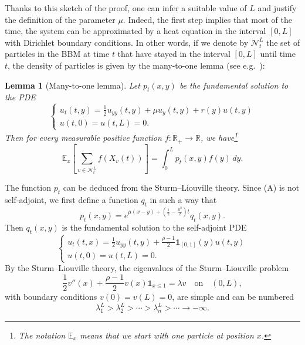 \documentclass[11pt]{article}
\theoremstyle{plain}
\newtheorem{lemma}{Lemma}[section]
\begin{document}
Thanks to this sketch of the proof, one can infer a suitable value of $L$ and justify the definition of the parameter $\mu$. Indeed, the first step implies that most of the time, the system can be approximated by a heat equation in the interval $[0,L]$ with Dirichlet boundary conditions. In other words, if we denote by $\mathcal N^L_t$ the set of particles in the BBM at time $t$ that have stayed in the interval $[0,L]$  until time $t$, the density of particles is given by the many-to-one lemma (see e.g.~\cite[p.188]{Lawler:2018vn}):
\begin{lemma}[Many-to-one lemma]
\label{lem:many-to-one}
Let $p_t(x,y)$ be the fundamental solution to the PDE
\begin{equation}
\begin{cases}
u_t(t,y) = \frac{1}{2}u_{yy}(t,y) + \mu u_y(t,y) + r(y)u(t,y)\\
u(t,0) = u(t,L) = 0.
\end{cases}\label{PDE:A}\tag{A}
\end{equation}
Then for every measurable positive  function $f:\mathbb{R}_+\to\mathbb{R}$, we have\footnote{The notation $\mathbb{E}_x$ means that we start with one particle at position $x$.}
\[
\mathbb{E}_x\left[\sum_{v\in \mathcal N^L_t} f(X_v(t))\right] = \int_0^L p_t(x,y) f(y)\,dy.
\]
\end{lemma}
The function $p_t$ can be deduced from the Sturm--Liouville theory. Since (A) is not self-adjoint, we first define a function $q_t$ in such a way that 
\begin{equation}
p_t(x,y) = e^{\mu(x-y)+ \left(\frac{1}{2}-\frac{\mu^2}{2}\right)t}q_t(x,y).\label{eq:ptqt}
\end{equation}
Then $q_t(x,y)$ is the fundamental solution to the self-adjoint PDE
\begin{equation}
\label{PDE:B}\tag{B}
\begin{cases}
u_t(t,x) = \frac{1}{2}u_{yy}(t,y) + \frac{\rho-1}{2} \boldsymbol 1_{[0,1]}(y) u(t,y)\\
u(t,0) = u(t,L) = 0.
\end{cases}\end{equation}
By the Sturm--Liouville theory, the eigenvalues of the Sturm--Liouville problem
\begin{equation}
\frac{1}{2}v''(x)+\frac{\rho-1}{2} v(x)\mathbb{1}_{x\leqslant 1}=\lambda v \quad \text{on} \quad  (0,L)\label{def:Tintro},
\end{equation}
with boundary conditions $v(0)=v(L)=0$, are simple and can be numbered
\[
\lambda_1^L > \lambda_2^L > \cdots > \lambda_n^L >\cdots\to -\infty.
\]
\end{document}
